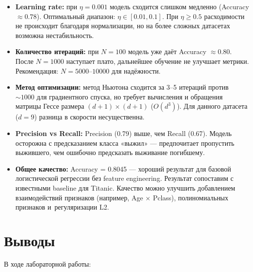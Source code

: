 \documentclass[12pt,a4paper]{article}
\begin{document}
\begin{itemize}
    \item \textbf{Learning rate:} при \(\eta = 0.001\) модель сходится
          слишком медленно (Accuracy \(\approx 0.78\)). Оптимальный
          диапазон: \(\eta \in [0.01, 0.1]\). При \(\eta \geq 0.5\)
          расходимости не происходит благодаря нормализации, но на
          более сложных датасетах возможна нестабильность.
    \item \textbf{Количество итераций:} при \(N = 100\) модель уже даёт
          Accuracy \(\approx 0.80\). После \(N = 1000\) наступает плато,
          дальнейшее обучение не улучшает метрики. Рекомендация:
          \(N = 5000\text{--}10000\) для надёжности.
    \item \textbf{Метод оптимизации:} метод Ньютона сходится за 3–5
          итераций против \(\sim 1000\) для градиентного спуска, но
          требует вычисления и обращения матрицы Гессе размера
          \((d+1)\times(d+1)\) (\(O(d^3)\)). Для данного датасета
          (\(d = 9\)) разница в скорости несущественна.
    \item \textbf{Precision vs Recall:} Precision (0.79) выше, чем Recall
          (0.67). Модель осторожна с предсказанием класса «выжил» —
          предпочитает пропустить выжившего, чем ошибочно предсказать
          выживание погибшему.
    \item \textbf{Общее качество:} Accuracy = 0.8045 — хороший результат
          для базовой логистической регрессии без feature engineering.
          Результат сопоставим с известными baseline для Titanic.
          Качество можно улучшить добавлением взаимодействий признаков
          (например, Age \(\times\) Pclass), полиномиальных признаков
          и~регуляризации L2.
\end{itemize}

\section{Выводы}

В ходе лабораторной работы:
\end{document}
